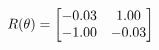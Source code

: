 \documentclass[preview]{standalone}
\begin{document}
\begin{align*}
\special{dvisvgm:raw <g id='unique000'>}R(\theta) = \begin{bmatrix}-0.03 & 1.00\\-1.00 & -0.03\end{bmatrix}\special{dvisvgm:raw </g>}
\end{align*}
\end{document}
